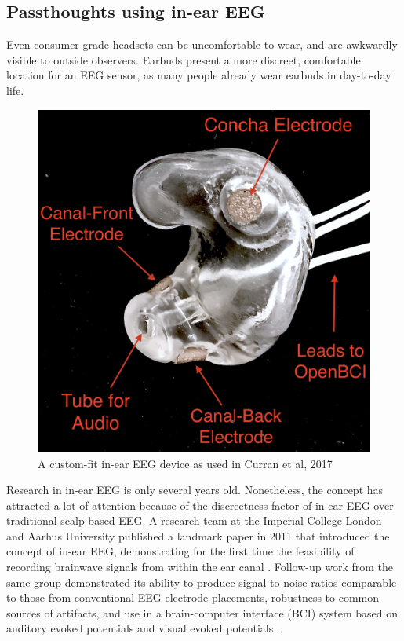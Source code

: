 \documentclass[sigconf]{acmart}
\begin{document}
\subsection{Passthoughts using in-ear EEG}
\label{sec:org6567572}

Even consumer-grade headsets can be uncomfortable to wear, and are awkwardly visible to outside observers. Earbuds present a more discreet, comfortable location for an EEG sensor, as many people already wear earbuds in day-to-day life.

\label{fig:earbud}
\begin{figure}[t!]
\centering
\includegraphics[width=.9\linewidth]{./figures/custom-fit-eeg-annotated.jpg}
\caption{A custom-fit in-ear EEG device as used in Curran et al, 2017}
\end{figure}

Research in in-ear EEG is only several years old. Nonetheless, the concept has
attracted a lot of attention because of the discreetness factor of in-ear EEG over
traditional scalp-based EEG. A research team at the Imperial College London
and Aarhus University published a landmark paper in 2011 that introduced the
concept of in-ear EEG, demonstrating for the first time the feasibility of recording
brainwave signals from within the ear canal
\cite{Looney2011}.
Follow-up work from the same
group demonstrated its ability to produce signal-to-noise ratios comparable to
those from conventional EEG electrode placements, robustness to common
sources of artifacts, and use in a brain-computer interface (BCI) system based on
auditory evoked potentials and visual evoked potentials
\cite{Looney2012a,Kidmose2013a,Kidmose2013b}.
\end{document}
